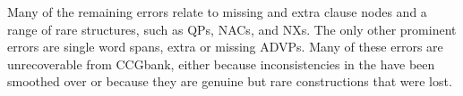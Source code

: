 Many of the remaining errors relate to missing and extra clause nodes and a range of rare structures, such as QPs, NACs, and NXs.
The only other prominent errors are single word spans, \myeg extra or missing ADVPs.
Many of these errors are unrecoverable from CCGbank, either because inconsistencies in the \ptb have been smoothed over or because they are genuine but rare constructions that were lost.

\begin{figure}
\centering
  \hfill
  \hfill
	\\

\end{figure}
